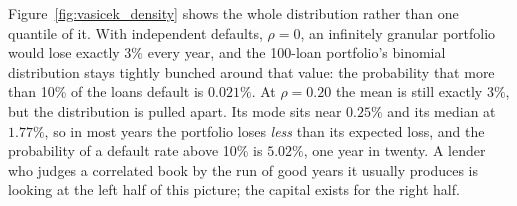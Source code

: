 \documentclass[../ai_in_finance]{subfiles}
\begin{document}
Figure~\ref{fig:vasicek_density} shows the whole distribution rather than one quantile of it. With independent defaults, $\rho=0$, an infinitely granular portfolio would lose exactly $3\%$ every year, and the 100-loan portfolio's binomial distribution stays tightly bunched around that value: the probability that more than 10\% of the loans default is $0.021\%$. At $\rho=0.20$ the mean is still exactly $3\%$, but the distribution is pulled apart. Its mode sits near $0.25\%$ and its median at $1.77\%$, so in most years the portfolio loses \emph{less} than its expected loss, and the probability of a default rate above 10\% is $5.02\%$, one year in twenty. A lender who judges a correlated book by the run of good years it usually produces is looking at the left half of this picture; the capital exists for the right half.
\end{document}
